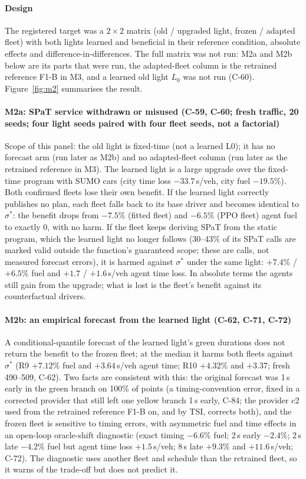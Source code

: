 \paragraph{Design} The registered target was a $2\times2$ matrix (old / upgraded light, frozen / adapted fleet) with both lights learned and
beneficial in their reference condition, absolute effects and difference-in-differences. The full matrix was not run: M2a and M2b below are
its parts that were run, the adapted-fleet column is the retrained reference F1-B in M3, and a learned old light $L_0$ was not run (C-60).
Figure~\ref{fig:m2} summarises the result.
\paragraph{M2a: SPaT service withdrawn or misused (C-59, C-60; fresh traffic, 20 seeds; four light seeds paired with four fleet
seeds, not a factorial)} Scope of this panel: the old light is fixed-time (not a learned L0); it has no forecast arm (run later as M2b)
and no adapted-fleet column (run later as the retrained reference in M3). The learned light is a large
upgrade over the fixed-time program with SUMO cars (city time loss $-33.7$\,s/veh, city fuel $-19.5\%$). Both confirmed fleets lose their
own benefit. If the learned light correctly publishes no plan, each fleet falls back to its base driver and becomes identical to
$\sigma^*$: the benefit drops from $-7.5\%$ (fitted fleet) and $-6.5\%$ (PPO fleet) agent fuel to exactly 0, with no harm. If the fleet
keeps deriving SPaT from the static program, which the learned light no longer follows (30--43\% of its SPaT calls are marked valid
outside the function's guaranteed scope; these are calls, not measured forecast errors), it is harmed against $\sigma^*$ under the same light: $+7.4\%$ / $+6.5\%$ fuel and $+1.7$ / $+1.6$\,s/veh agent time loss. In
absolute terms the agents still gain from the upgrade; what is lost is the fleet's benefit against its counterfactual drivers.
\paragraph{M2b: an empirical forecast from the learned light (C-62, C-71, C-72)} A conditional-quantile forecast of the learned light's
green durations does not return the benefit to the frozen fleet; at the median it harms both fleets against $\sigma^*$ (R9 $+7.12\%$ fuel and
$+3.64$\,s/veh agent time; R10 $+4.32\%$ and $+3.37$; fresh 490--509, C-62). Two facts are consistent with this: the original forecast was 1\,s early in
the green branch on 100\% of points (a timing-convention error, fixed in a corrected provider that still left one yellow branch 1\,s early, C-84; the provider c2 used from
the retrained reference F1-B on, and by TSI, corrects both),
and the frozen fleet is sensitive to timing errors, with asymmetric fuel and time effects in an open-loop oracle-shift diagnostic (exact
timing $-6.6\%$ fuel; 2\,s early $-2.4\%$; 2\,s late $-4.2\%$ fuel but agent time loss $+1.5$\,s/veh; 8\,s late $+9.3\%$ and $+11.6$\,s/veh;
C-72). The diagnostic uses another fleet and schedule than the retrained fleet, so it warns of the trade-off but does not predict it.

